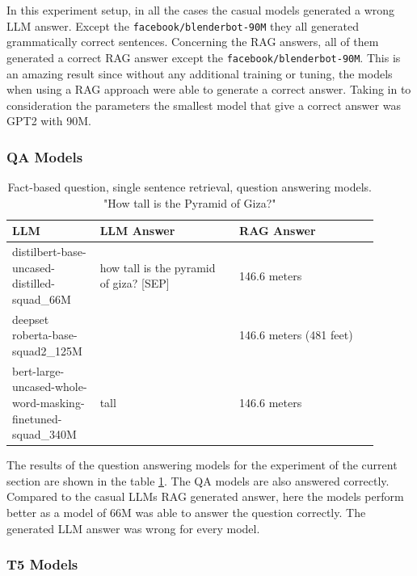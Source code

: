 \documentclass{wseas}
\begin{document}
In this experiment setup, in all the cases the casual models generated a wrong LLM answer. Except
the \texttt{facebook/blenderbot-90M} they all generated grammatically
correct sentences. Concerning the RAG answers, all of them generated a
correct RAG answer except the \texttt{facebook/blenderbot-90M}. This is
an amazing result since without any additional training or tuning, the
models when using a RAG approach were able to generate a correct answer.
Taking in to consideration the parameters the smallest model that give a
correct answer was GPT2 with 90M.


\subsubsection{QA Models}

\begin{table}[htbp]
  \caption{Fact-based question, single sentence retrieval, question answering models. "How tall is the Pyramid of Giza?"} %
  \centering
  \label{tab:experiment_R_1_sentence_Q_fact_M_question_answering_table}  %
    \begin{tabular}{|p{0.2\linewidth}|p{0.35\linewidth}|p{0.35\linewidth}|}
      \hline
      \textbf{LLM} & \textbf{LLM Answer} & \textbf{RAG Answer} \\ \hline
      distilbert-base-uncased-distilled-squad\_66M & how tall is the pyramid of giza? {[}SEP{]} & 146.6 meters \\ \hline
      deepset roberta-base-squad2\_125M &  & 146.6 meters (481 feet) \\ \hline
      bert-large-uncased-whole-word-masking-finetuned-squad\_340M & tall & 146.6 meters \\ \hline
    \end{tabular}
\end{table}
The results of the question answering models for the experiment of the 
current section are shown in the table \ref{tab:experiment_R_1_sentence_Q_fact_M_question_answering_table}.
The QA models are also answered correctly. Compared to the casual LLMs
RAG generated answer, here the models perform better as a model of 66M
was able to answer the question correctly. The generated LLM answer was
wrong for every model.

\subsubsection{T5 Models}
\end{document}
